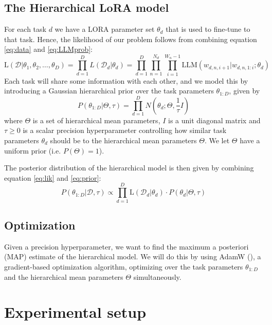 \documentclass{article}
\begin{document}
\subsection{The Hierarchical LoRA model}
For each task $d$ we have a LORA parameter set $\theta_d$ that is used to fine-tune to that task.
Hence, the likelihood of our problem follows from combining equation \ref{eq:data} and \ref{eq:LLMprob}:
\begin{equation} \label{eq:lik}
    \text{L}(\mathcal{D} | \theta_1, \theta_2, \ldots, \theta_D) = \prod_{d=1}^D L(\mathcal{D}_d | \theta_d) = \prod_{d=1}^D \prod_{n=1}^{N_d} \prod_{i=1}^{W_n-1} \text{LLM}(w_{d,n,i+1} | w_{d,n,1:i}; \theta_d)
\end{equation}
%
%
Each task will share some information with each other, and we model this by introducing a Gaussian hierarchical prior over the task parameters $\theta_{1:D}$, given by
\begin{equation} \label{eq:prior}
    P(\theta_{1:D} | \Theta, \tau ) = \prod_{d=1}^D N(\theta_d ; \Theta, \frac{1}{\tau} I)
\end{equation}
%
where $\Theta$ is a set of hierarchical mean parameters, $I$ is a unit diagonal matrix and $\tau \geq 0$ is a scalar precision hyperparameter controlling how similar task parameters $\theta_d$ should be to the hierarchical mean parameters $\Theta$.
We let $\Theta$ have a uniform prior (i.e. $P(\Theta) = 1$).

The posterior distribution of the hierarchical model is then given by combining equation \ref{eq:lik} and \ref{eq:prior}:
\begin{equation} \label{eq:posterior}
    P(\theta_{1:D} | \mathcal{D}, \tau) \propto \prod_{d=1}^D \text{L}(\mathcal{D}_d | \theta_d) \cdot P(\theta_d | \Theta, \tau)
\end{equation}
%

\subsection{Optimization}
Given a precision hyperparameter, we want to find the maximum a posteriori (MAP) estimate of the hierarchical model. We will do this by using AdamW (\cite{adamW}), a gradient-based optimization algorithm, optimizing over the task parameters $\theta_{1:D}$ and the hierarchical mean parameters $\Theta$ simultaneously.

\section{Experimental setup}
\end{document}
